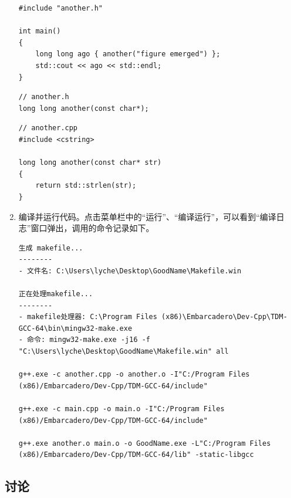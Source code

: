 \begin{enumerate}
\begin{lstlisting}[language={[17]C++}, moreemph={[2]another}]
#include "another.h"

int main()
{
	long long ago { another("figure emerged") };
	std::cout << ago << std::endl;
}
	\end{lstlisting}

	\begin{lstlisting}[language={[17]C++}, moreemph={[2]another}]
// another.h
long long another(const char*);
	\end{lstlisting}

	\begin{lstlisting}[language={[17]C++}, moreemph={[2]another, strlen}]
// another.cpp
#include <cstring>

long long another(const char* str)
{
	return std::strlen(str);
}
	\end{lstlisting}

	\item 编译并运行代码。点击菜单栏中的“运行”、“编译运行”，可以看到“编译日志”窗口弹出，调用的命令记录如下。

	\begin{lstlisting}[language={}]
生成 makefile...
--------
- 文件名: C:\Users\lyche\Desktop\GoodName\Makefile.win

正在处理makefile...
--------
- makefile处理器: C:\Program Files (x86)\Embarcadero\Dev-Cpp\TDM-GCC-64\bin\mingw32-make.exe
- 命令: mingw32-make.exe -j16 -f "C:\Users\lyche\Desktop\GoodName\Makefile.win" all

g++.exe -c another.cpp -o another.o -I"C:/Program Files (x86)/Embarcadero/Dev-Cpp/TDM-GCC-64/include"

g++.exe -c main.cpp -o main.o -I"C:/Program Files (x86)/Embarcadero/Dev-Cpp/TDM-GCC-64/include"

g++.exe another.o main.o -o GoodName.exe -L"C:/Program Files (x86)/Embarcadero/Dev-Cpp/TDM-GCC-64/lib" -static-libgcc
	\end{lstlisting}
\end{enumerate}

\subsection*{讨论}

